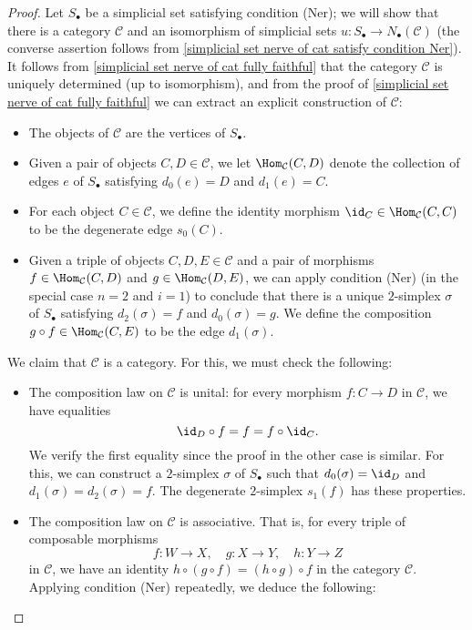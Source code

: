 \begin{proof}
Let $S_\bullet$ be a simplicial set satisfying condition (Ner); we will show that there is a category $\mathcal{C}$ and an isomorphism of simplicial sets $u:S_\bullet\to N_\bullet(\mathcal{C})$ (the converse assertion follows from \cref{simplicial set nerve of cat satisfy condition Ner}). It follows from \cref{simplicial set nerve of cat fully faithful} that the category $\mathcal{C}$ is uniquely determined (up to isomorphism), and from the proof of \cref{simplicial set nerve of cat fully faithful} we can extract an explicit construction of $\mathcal{C}$:
\begin{itemize}
\item The objects of $\mathcal{C}$ are the vertices of $S_\bullet$.
\item Given a pair of objects $C,D\in\mathcal{C}$, we let $\Hom_{\mathcal{C}}(C,D)$ denote the collection of edges $e$ of $S_\bullet$ satisfying $d_0(e)=D$ and $d_1(e)=C$.
\item For each object $C\in\mathcal{C}$, we define the identity morphism $\id_C\in\Hom_{\mathcal{C}}(C,C)$ to be the degenerate edge $s_0(C)$.
\item Given a triple of objects $C,D,E\in\mathcal{C}$ and a pair of morphisms $f\in\Hom_{\mathcal{C}}(C,D)$ and $g\in\Hom_{\mathcal{C}}(D,E)$, we can apply condition (Ner) (in the special case $n=2$ and $i=1$) to conclude that there is a unique $2$-simplex $\sigma$ of $S_\bullet$ satisfying $d_2(\sigma)=f$ and $d_0(\sigma)=g$. We define the composition $g\circ f\in\Hom_{\mathcal{C}}(C,E)$ to be the edge $d_1(\sigma)$.
\end{itemize}
We claim that $\mathcal{C}$ is a category. For this, we must check the following:
\begin{itemize}
\item The composition law on $\mathcal{C}$ is unital: for every morphism $f:C\to D$ in $\mathcal{C}$, we have equalities
\[\id_D\circ f=f=f\circ\id_C.\]
We verify the first equality since the proof in the other case is similar. For this, we can construct a $2$-simplex $\sigma$ of $S_\bullet$ such that $d_0(\sigma)=\id_D$ and $d_1(\sigma)=d_2(\sigma)=f$. The degenerate $2$-simplex $s_1(f)$ has these properties.
\item The composition law on $\mathcal{C}$ is associative. That is, for every triple of composable morphisms
\[f:W\to X,\quad g:X\to Y,\quad h:Y\to Z\]
in $\mathcal{C}$, we have an identity $h\circ(g\circ f)=(h\circ g)\circ f$ in the category $\mathcal{C}$. Applying condition (Ner) repeatedly, we deduce the following:

\end{itemize}
\end{proof}
